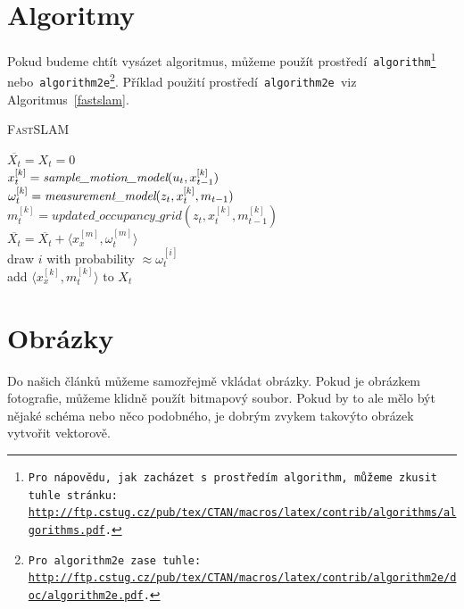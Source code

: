 \documentclass[11pt,a4paper]{article}
\begin{document}
\bigskip
\pagebreak

\section{Algoritmy}
\label{algorithms}
Pokud budeme chtít vysázet algoritmus, můžeme použít prostředí\texttt{ algorithm\footnote{
Pro nápovědu, jak zacházet s~prostředím\texttt{ algorithm,} můžeme zkusit tuhle stránku: \\
\href{http://ftp.cstug.cz/pub/tex/CTAN/macros/latex/contrib/algorithms/algorithms.pdf}{http://ftp.cstug.cz/pub/tex/CTAN/macros/latex/contrib/algorithms/algorithms.pdf}.
} }
nebo\texttt{ algorithm2e\footnote{Pro\texttt{ algorithm2e }zase tuhle: \href{http://ftp.cstug.cz/pub/tex/CTAN/macros/latex/contrib/algorithm2e/doc/algorithm2e.pdf}{http://ftp.cstug.cz/pub/tex/CTAN/macros/latex/contrib/algorithm2e/doc/algorithm2e.pdf}.
}}. Příklad použití prostředí\texttt{ algorithm2e }viz Algoritmus~\ref{fastslam}.
\\
\IncMargin{1.5em}
\begin{algorithm}
    \label{fastslam}
	\caption{\textsc{FastSLAM}}
    \SetNlSty{}{}{:}
	\SetInd{1em}{1em}
	\Indm\Indmm
	\Indp\Indpp
	\BlankLine
	$\overline{X_t} = X_t = 0$ \\
	{
		$x_t^{[k]} = \emph{sample\_motion\_model}(u_t, x_{t - 1}^{[k]})$ \\
		$\omega_t^{[k]} = \emph{measurement\_model}(z_t, x_t^{[k]}, m_{t - 1})$ \\
		$m_t^{[k]} = updated\_occupancy\_grid(z_t, x_t^{[k]}, m_{t - 1}^{[k]})$ \\
		$\overline{X_t} = \overline{X_t} + \langle x_x^{[m]}, \omega_t^{[m]} \rangle$ \\
	}
	{
		draw $i$ with probability $\approx \omega_t^{[i]}$ \\
		add $\langle x_x^{[k]}, m_t^{[k]} \rangle \textrm{ to } X_t$ \\
	}
\end{algorithm}
\DecMargin{1.5em}
	
\section{Obrázky}
Do našich článků můžeme samozřejmě vkládat obrázky. Pokud je obrázkem fotografie,
můžeme klidně použít bitmapový soubor. Pokud by to ale mělo být nějaké schéma nebo
něco podobného, je dobrým zvykem takovýto obrázek vytvořit vektorově.
\end{document}
